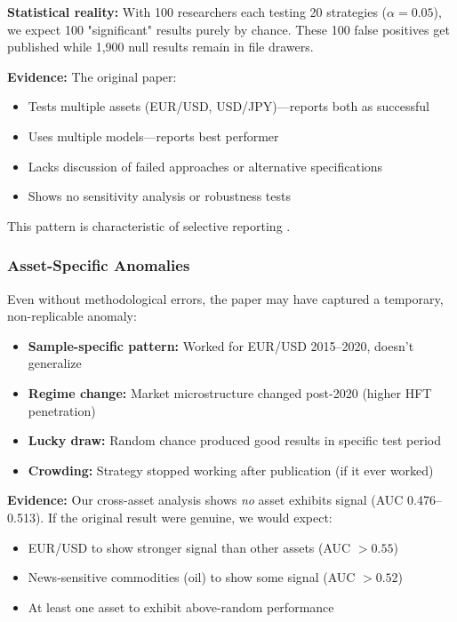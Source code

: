 \documentclass[11pt]{article}
\begin{document}
\textbf{Statistical reality:} With 100 researchers each testing 20 strategies ($\alpha = 0.05$), we expect 100 "significant" results purely by chance. These 100 false positives get published while 1,900 null results remain in file drawers.

\textbf{Evidence:} The original paper:
\begin{itemize}
    \item Tests multiple assets (EUR/USD, USD/JPY)---reports both as successful
    \item Uses multiple models---reports best performer
    \item Lacks discussion of failed approaches or alternative specifications
    \item Shows no sensitivity analysis or robustness tests
\end{itemize}

This pattern is characteristic of selective reporting \citep{mclean2016does}.

\subsubsection{Asset-Specific Anomalies}

Even without methodological errors, the paper may have captured a temporary, non-replicable anomaly:

\begin{itemize}
    \item \textbf{Sample-specific pattern:} Worked for EUR/USD 2015--2020, doesn't generalize
    \item \textbf{Regime change:} Market microstructure changed post-2020 (higher HFT penetration)
    \item \textbf{Lucky draw:} Random chance produced good results in specific test period
    \item \textbf{Crowding:} Strategy stopped working after publication (if it ever worked)
\end{itemize}

\textbf{Evidence:} Our cross-asset analysis shows \textit{no} asset exhibits signal (AUC 0.476--0.513). If the original result were genuine, we would expect:
\begin{itemize}
    \item EUR/USD to show stronger signal than other assets (AUC $> 0.55$)
    \item News-sensitive commodities (oil) to show some signal (AUC $> 0.52$)
    \item At least one asset to exhibit above-random performance
\end{itemize}
\end{document}
